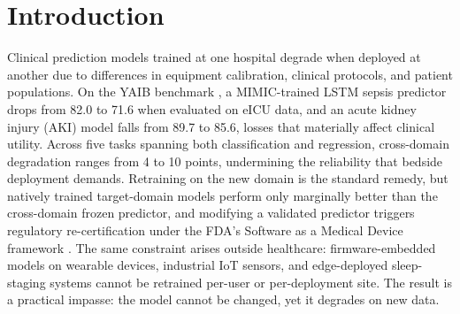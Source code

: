 
\section{Introduction}
\label{sec:introduction}

Clinical prediction models trained at one hospital degrade when deployed at another due to differences in equipment calibration, clinical protocols, and patient populations.
On the YAIB benchmark \citep{vandewater2024yaib}, a MIMIC-trained LSTM sepsis predictor drops from 82.0 to 71.6 \aucroc{} when evaluated on eICU data, and an acute kidney injury (AKI) model falls from 89.7 to 85.6, losses that materially affect clinical utility.
Across five tasks spanning both classification and regression, cross-domain degradation ranges from 4 to 10 \aucroc{} points, undermining the reliability that bedside deployment demands.
Retraining on the new domain is the standard remedy, but natively trained target-domain models perform only marginally better than the cross-domain frozen predictor, and modifying a validated predictor triggers regulatory re-certification under the FDA's Software as a Medical Device framework \citep{fda2021samd}.
The same constraint arises outside healthcare: firmware-embedded models on wearable devices, industrial IoT sensors, and edge-deployed sleep-staging systems cannot be retrained per-user or per-deployment site.
The result is a practical impasse: the model cannot be changed, yet it degrades on new data.

